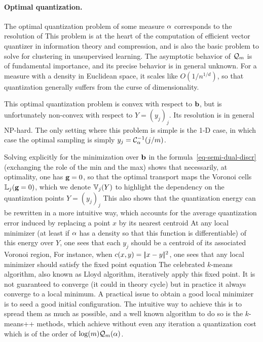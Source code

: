 \paragraph{Optimal quantization.}

The optimal quantization problem of some measure $\alpha$ corresponds to the resolution of
This problem is at the heart of the computation of efficient vector quantizer in information theory and compression, and is also the basic problem to solve for clustering in unsupervised learning.
%
The asymptotic behavior of $\mathcal{Q}_m$ is of fundamental importance, and its precise behavior is in general unknown. For a measure with a density in Euclidean space, it scales like $O(1/n^{1/d})$, so that quantization generally suffers from the curse of dimensionality.

This optimal quantization problem is convex with respect to $\mathrm{\textbf{\upshape b}}$, but is unfortunately non-convex with respect to $Y=(y_j)_j$. Its resolution is in general NP-hard.
%
The only setting where this problem is simple is the 1-D case, in which case the optimal sampling is simply $y_j = \mathcal{C}_\alpha^{-1}(j/m)$. 

 
Solving explicitly for the minimization over $\mathrm{\textbf{\upshape b}}$ in the formula~\eqref{eq-semi-dual-discr} (exchanging the role of the min and the max) shows that necessarily, at optimality, one has $\mathrm{\textbf{\upshape g}}=0$, so that the optimal transport maps the Voronoi cells $\mathbb{L}_{j}(\mathrm{\textbf{\upshape g}}=0)$, which we denote $\mathbb{V}_j(Y)$ to highlight the dependency on the quantization points $Y=(y_j)_j$
This also shows that the quantization energy can be rewritten in a more intuitive way, which accounts for the average quantization error induced by replacing a point $x$ by its nearest centroid
At any local minimizer (at least if $\alpha$ has a density so that this function is differentiable) of this energy over $Y$, one sees that each $y_j$ should be a centroid of its associated Voronoi region, 
For instance, when $c(x,y)=|\!| x-y |\!|^2$, one sees that any local minimizer should satisfy the fixed point equation
The celebrated $k$-means algorithm, also known as Lloyd algorithm, iteratively apply this fixed point. It is not guaranteed to converge (it could in theory cycle) but in practice it always converge to a local minimum. 
%
A practical issue to obtain a good local minimizer is to seed a good initial configuration. The intuitive way to achieve this is to spread them as much as possible, and a well known algorithm to do so is the $k$-means++ methods, which achieve without even any iteration a quantization cost which is of the order of $\log(m) \mathcal{Q}_m(\alpha)$.  
 
